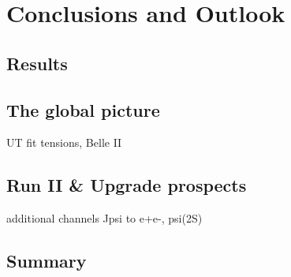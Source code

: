 
\chapter{Conclusions and Outlook}
\section{Results}
\section{The global picture}
UT fit tensions, Belle II
\section{Run II \& Upgrade prospects}
additional channels Jpsi to e+e-, psi(2S)
\section{Summary}
